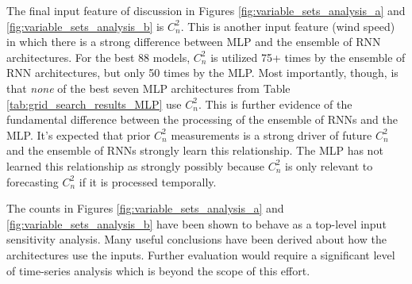 The final input feature of discussion in Figures \ref{fig:variable_sets_analysis_a} and \ref{fig:variable_sets_analysis_b} is $C_{n}^{2}$. This is another input feature (wind speed) in which there is a strong difference between \ac{MLP} and the ensemble of \ac{RNN} architectures. For the best 88 models, $C_{n}^{2}$ is utilized 75+ times by the ensemble of \ac{RNN} architectures, but only 50 times by the \ac{MLP}. Most importantly, though, is that \emph{none} of the best seven \ac{MLP} architectures from Table \ref{tab:grid_search_results_MLP} use $C_{n}^{2}$. This is further evidence of the fundamental difference between the processing of the ensemble of \ac{RNN}s and the \ac{MLP}. It's expected that prior $C_{n}^{2}$ measurements is a strong driver of future $C_{n}^{2}$ and the ensemble of \ac{RNN}s strongly learn this relationship. The \ac{MLP} has not learned this relationship as strongly possibly because $C_{n}^{2}$ is only relevant to forecasting $C_{n}^{2}$ if it is processed temporally.

The counts in Figures \ref{fig:variable_sets_analysis_a} and \ref{fig:variable_sets_analysis_b} have been shown to behave as a top-level input sensitivity analysis. Many useful conclusions have been derived about how the architectures use the inputs. Further evaluation would require a significant level of time-series analysis which is beyond the scope of this effort.

